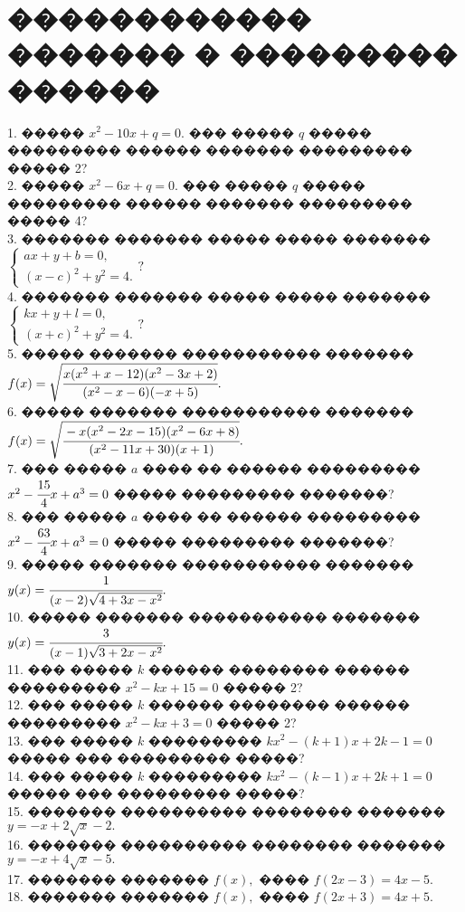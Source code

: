 \documentclass[12pt]{article}
\begin{document}
\section{������������ ������� � ��������� ������}
1. ����� $x^2-10x+q=0.$ ��� ����� $q$ ����� ��������� ������ ������� ��������� ����� 2?\\
2. ����� $x^2-6x+q=0.$ ��� ����� $q$ ����� ��������� ������ ������� ��������� ����� 4?\\
3. ������� ������� ����� ����� ������� $\begin{cases} ax+y+b=0,\\ (x-c)^2+y^2=4.\end{cases}?$\\
4. ������� ������� ����� ����� ������� $\begin{cases} kx+y+l=0,\\ (x+c)^2+y^2=4.\end{cases}?$\\
5. ����� ������� ����������� ������� $f(x)=\sqrt{\cfrac{x(x^2+x-12)(x^2-3x+2)}{(x^2-x-6)(-x+5)}}.$\\
6. ����� ������� ����������� ������� $f(x)=\sqrt{\cfrac{-x(x^2-2x-15)(x^2-6x+8)}{(x^2-11x+30)(x+1)}}.$\\
7. ��� ����� $a$ ���� �� ������ ��������� $x^2-\cfrac{15}{4}x+a^3=0$ ����� ��������� �������?\\
8. ��� ����� $a$ ���� �� ������ ��������� $x^2-\cfrac{63}{4}x+a^3=0$ ����� ��������� �������?\\
9. ����� ������� ����������� ������� $y(x)=\cfrac{1}{(x-2)\sqrt{4+3x-x^2}}.$\\
10. ����� ������� ����������� ������� $y(x)=\cfrac{3}{(x-1)\sqrt{3+2x-x^2}}.$\\
11. ��� ����� $k$ ������ �������� ������ ��������� $x^2-kx+15=0$ ����� 2?\\
12. ��� ����� $k$ ������ �������� ������ ��������� $x^2-kx+3=0$ ����� 2?\\
13. ��� ����� $k$ ��������� $kx^2-(k+1)x+2k-1=0$ ����� ��� ��������� �����?\\
14. ��� ����� $k$ ��������� $kx^2-(k-1)x+2k+1=0$ ����� ��� ��������� �����?\\
15. ������� ���������� �������� ������� $y=-x+2\sqrt{x}-2.$\\
16. ������� ���������� �������� ������� $y=-x+4\sqrt{x}-5.$\\
17. ������� ������� $f(x),$ ���� $f(2x-3)=4x-5.$\\
18. ������� ������� $f(x),$ ���� $f(2x+3)=4x+5.$\\
\end{document}
